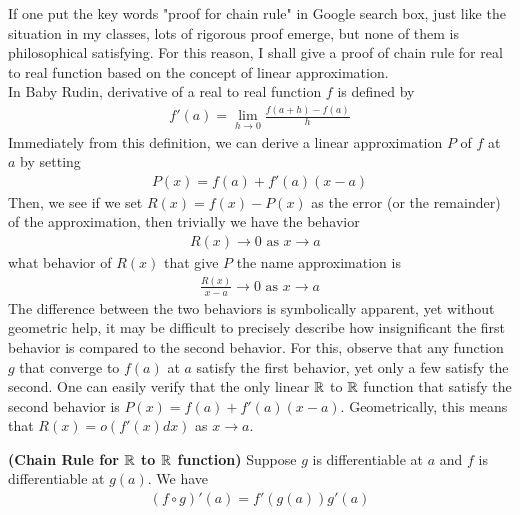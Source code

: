 \documentclass{report}
\begin{document}
\begin{mdframed}
If one put the key words "proof for chain rule" in Google search box, just like the situation in my classes, lots of rigorous proof emerge, but none of them is philosophical satisfying. For this reason, I shall give a proof of chain rule for real to real function based on the concept of linear approximation.\\

In Baby Rudin, derivative of a real to real function $f$ is defined by 
\begin{align*}
f'(a)=\lim_{h\to 0}\frac{f(a+h)-f(a)}{h}
\end{align*}
Immediately from this definition, we can derive a linear approximation $P$ of $f$ at $a$ by setting 
\begin{align*}
P(x)=f(a)+f'(a)(x-a)
\end{align*}
Then, we see if we set $R(x)=f(x)-P(x)$ as the error (or the remainder) of the approximation, then trivially we have the behavior
\begin{align*}
R(x)\to 0\text{ as $x\to a$ }
\end{align*}
what behavior of $R(x)$ that give $P$ the name approximation is 
\begin{align*}
\frac{R(x)}{x-a}\to 0\text{ as }x\to a
\end{align*}
The difference between the two behaviors is symbolically apparent, yet without geometric help, it may be difficult to precisely describe how insignificant the first behavior is compared to the second behavior. For this, observe that any function $g$ that converge to  $f(a)$ at $a$ satisfy the first behavior, yet only a few satisfy the second. One can easily verify that the only linear $\mathbb{R}$ to  $\mathbb{R}$ function that satisfy the second behavior is  $P(x)=f(a)+f'(a)(x-a)$. Geometrically, this means that $R(x)=o(f'(x)dx)$ as $x \to a$.
\label{12}
\end{mdframed}
\begin{theorem}
\textbf{(Chain Rule for $\mathbb{R}$ to $\mathbb{R}$ function)} Suppose $g$ is differentiable at  $a$ and  $f$ is differentiable at  $g(a)$. We have 
\begin{align*}
  (f\circ g)'(a)=f'(g(a))g'(a)
\end{align*}
\end{theorem}
\end{document}
